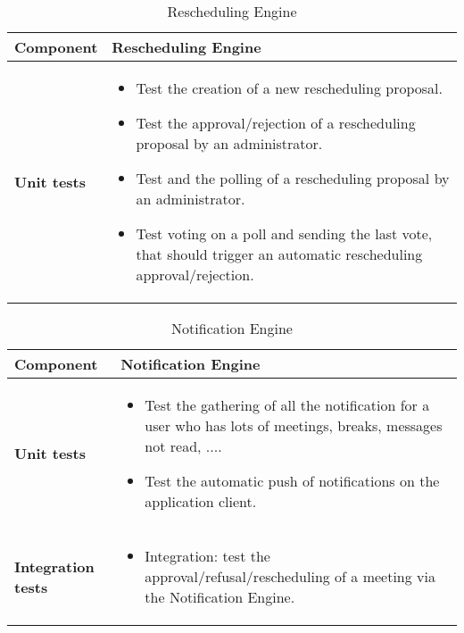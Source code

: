\begin{table}[h]	
	\centering
	\def\arraystretch{1.5}
	\begin{tabular}{|m{4cm}|m{12cm}|}
		\hline
		\textbf{Component} & Rescheduling Engine \\ \hline
		\textbf{Unit tests} & 
			\begin{itemize}
			\item Test the creation of a new rescheduling proposal.
			\item Test the approval/rejection of a rescheduling proposal by an administrator.
			\item Test and the polling of a rescheduling proposal by an administrator.
			\item Test voting on a poll and sending the last vote, that should trigger an automatic rescheduling approval/rejection.
			\end{itemize} \\ \hline
	\end{tabular}
	\caption{Rescheduling Engine}
\end{table}

\begin{table}[h]	
	\centering
	\def\arraystretch{1.5}
	\begin{tabular}{|m{4cm}|m{12cm}|}
		\hline
		\textbf{Component} & Notification Engine \\ \hline
		\textbf{Unit tests} & 
			\begin{itemize}
			\item Test the gathering of all the notification for a user who has lots of meetings, breaks, messages not read, ....
			\item Test the automatic push of notifications on the application client.
			\end{itemize} \\ \hline
		\textbf{Integration tests} & 
			\begin{itemize}
			\item Integration: test the approval/refusal/rescheduling of a meeting via the Notification Engine. 
			\end{itemize} \\ \hline
	\end{tabular}
	\caption{Notification Engine}
\end{table}

\clearpage